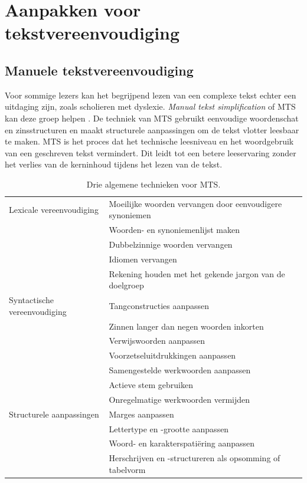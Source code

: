 \section{Aanpakken voor tekstvereenvoudiging}

\subsection{Manuele tekstvereenvoudiging}

Voor sommige lezers kan het begrijpend lezen van een complexe tekst echter een uitdaging zijn, zoals scholieren met dyslexie. \textit{Manual tekst simplification} of MTS kan deze groep helpen \autocite{Siddharthan2014}. De techniek van MTS gebruikt eenvoudige woordenschat en zinsstructuren en maakt structurele aanpassingen om de tekst vlotter leesbaar te maken. MTS is het proces dat het technische leesniveau en het woordgebruik van een geschreven tekst vermindert. Dit leidt tot een betere leeservaring zonder het verlies van de kerninhoud tijdens het lezen van de tekst.

\begin{center}
		\begin{table}[H]
			\begin{tabular}{ | m{4cm} | m{5cm} | m{5cm} | } 
			\hline
			Lexicale vereenvoudiging & Moeilijke woorden vervangen door eenvoudigere synoniemen & \\ 
				& Woorden- en synoniemenlijst maken & \\
				& Dubbelzinnige woorden vervangen & \\
				& Idiomen vervangen & \\ 
				& Rekening houden met het gekende jargon van de doelgroep &\\
			\hline
			Syntactische vereenvoudiging & Tangconstructies aanpassen &\\
			& Zinnen langer dan negen woorden inkorten &\\
			& Verwijswoorden aanpassen &\\
			& Voorzetseluitdrukkingen aanpassen &\\
			& Samengestelde werkwoorden aanpassen &\\
			& Actieve stem gebruiken & \autocite{Ruelas2020} \\
			& Onregelmatige werkwoorden vermijden &\\
			\hline
			Structurele aanpassingen & Marges aanpassen &\\
			& Lettertype en -grootte aanpassen &\\
			& Woord- en karakterspatiëring aanpassen &\\
			& Herschrijven en -structureren als opsomming of tabelvorm &\\
			\hline
		\end{tabular}
		\caption{Drie algemene technieken voor MTS.}
		\label{table:manual-simplification}
	\end{table}
\end{center}

